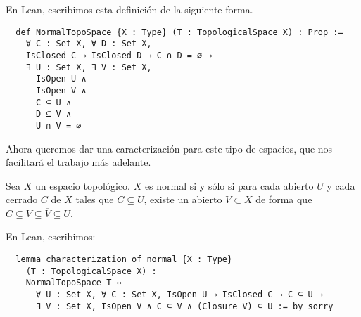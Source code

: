 En Lean, escribimos esta definición de la siguiente forma.

\begin{lstlisting}
  def NormalTopoSpace {X : Type} (T : TopologicalSpace X) : Prop :=
    ∀ C : Set X, ∀ D : Set X,
    IsClosed C → IsClosed D → C ∩ D = ∅ →
    ∃ U : Set X, ∃ V : Set X,
      IsOpen U ∧
      IsOpen V ∧
      C ⊆ U ∧
      D ⊆ V ∧
      U ∩ V = ∅
\end{lstlisting}

Ahora queremos dar una caracterización para este tipo de espacios, que nos facilitará el trabajo más adelante.

\begin{proposition}
  Sea $X$ un espacio topológico. $X$ es normal si y sólo si para cada abierto $U$ y cada cerrado $C$ de $X$ tales que $C \subseteq U$, existe un abierto $V \subset X$ de forma que $C \subseteq V \subseteq \overline{V} \subseteq U$.
\end{proposition}

En Lean, escribimos:

\begin{lstlisting}
  lemma characterization_of_normal {X : Type}
    (T : TopologicalSpace X) :
    NormalTopoSpace T ↔
      ∀ U : Set X, ∀ C : Set X, IsOpen U → IsClosed C → C ⊆ U →
      ∃ V : Set X, IsOpen V ∧ C ⊆ V ∧ (Closure V) ⊆ U := by sorry
\end{lstlisting}

